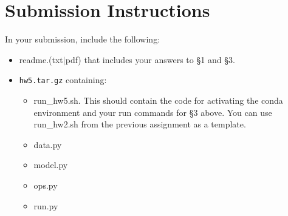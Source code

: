 \documentclass[11pt]{article}
\begin{document}
\section*{Submission Instructions}

In your submission, include the following:
\begin{itemize}
  \item readme.(txt$\mid$pdf) that includes your answers to \S1 and \S3. 
  \item \texttt{hw5.tar.gz} containing:
  \begin{itemize}
    \item run\_hw5.sh.  This should contain the code for activating the conda environment and your run commands for \S3 above.  You can use run\_hw2.sh from the previous assignment as a template.
    \item data.py
    \item model.py
    \item ops.py
    \item run.py
  \end{itemize}
\end{itemize}
\end{document}
